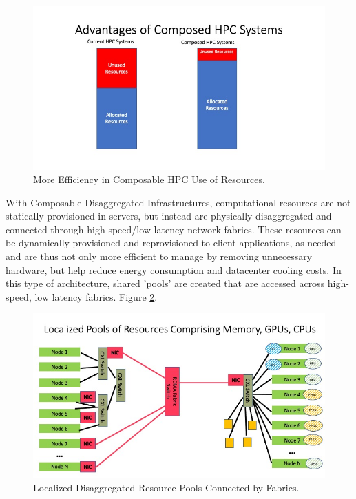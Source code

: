 \begin{figure}
\centerline{\includegraphics[width=\columnwidth]{Slide3.jpeg}}
\caption{More Efficiency in Composable HPC Use of Resources.} 
\label{fig:stranded}
\end{figure}

With Composable Disaggregated Infrastructures, computational resources are not statically provisioned in servers, but instead are physically disaggregated and connected through high-speed/low-latency network fabrics.  These resources can be dynamically provisioned and reprovisioned to client applications, as needed and are thus not only more efficient to manage by removing unnecessary hardware, but help reduce energy consumption and datacenter cooling costs.  In this type of architecture, shared 'pools' are created that are accessed across high-speed, low latency fabrics. Figure \ref{fig:Pools}.  

\begin{figure}
\centerline{\includegraphics[width=\columnwidth]{Slide4.jpeg}}
\caption{Localized Disaggregated Resource Pools Connected by Fabrics.} 
\label{fig:Pools}
\end{figure}
  
